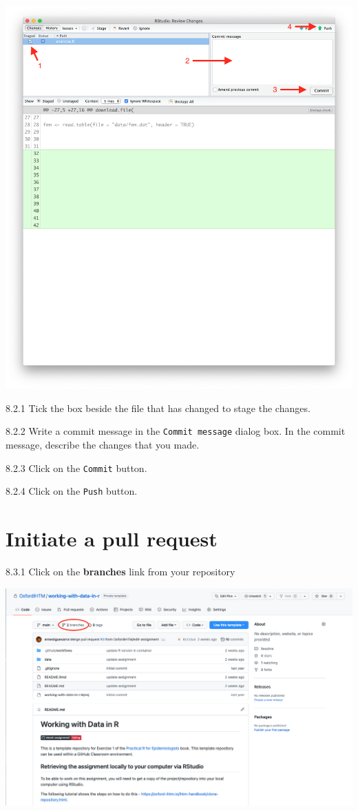 \documentclass[
  12pt,
]{book}
\begin{document}
\includegraphics{images/commit_push_pull2.png}

8.2.1 Tick the box beside the file that has changed to stage the changes.

8.2.2 Write a commit message in the \texttt{Commit\ message} dialog box. In the commit message, describe the changes that you made.

8.2.3 Click on the \texttt{Commit} button.

8.2.4 Click on the \texttt{Push} button.

\hypertarget{initiate-a-pull-request}{%
\section{Initiate a pull request}\label{initiate-a-pull-request}}

8.3.1 Click on the \textbf{branches} link from your repository

\includegraphics{images/pull_request1.png}
\end{document}
